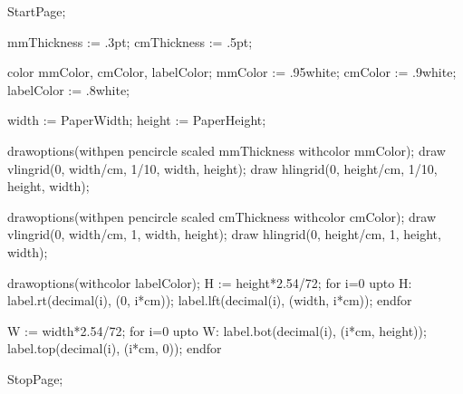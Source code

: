 


\startmodule [grid]

\unprotect



\setupbackgrounds
	[\c!page]
	[\c!background=\c!grid]


	StartPage;

	mmThickness := .3pt;
	cmThickness := .5pt;

	color mmColor, cmColor, labelColor;
	mmColor    := .95white;
	cmColor    := .9white;
	labelColor := .8white;

	width  := PaperWidth;
	height := PaperHeight;

	drawoptions(withpen pencircle scaled mmThickness withcolor mmColor);
	draw vlingrid(0, width/cm,  1/10, width,  height);
	draw hlingrid(0, height/cm, 1/10, height, width);

	drawoptions(withpen pencircle scaled cmThickness withcolor cmColor);
	draw vlingrid(0, width/cm,  1, width,  height);
	draw hlingrid(0, height/cm, 1, height, width);

	drawoptions(withcolor labelColor);
	H := height*2.54/72;
	for i=0 upto H:
		label.rt(decimal(i), (0, i*cm));
		label.lft(decimal(i), (width, i*cm));
	endfor

	W := width*2.54/72;
	for i=0 upto W:
		label.bot(decimal(i), (i*cm, height));
		label.top(decimal(i), (i*cm, 0));
	endfor

	StopPage;
\stopreusableMPgraphic

\protect

\stopmodule
